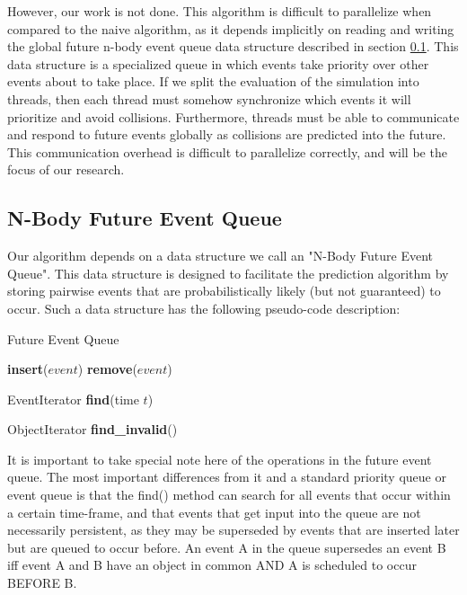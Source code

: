 \documentclass[CEJCS,PDF]{cej} %
\begin{document}
However, our work is not done.  This algorithm is difficult to parallelize when compared to the naive algorithm, as it depends implicitly on reading and writing the global future n-body event queue data structure described in section \ref{sec:neq}.  This data structure is a specialized queue in which events take priority over other events about to take place. If we split the evaluation of the simulation into threads, then each thread must somehow synchronize which events it will prioritize and avoid collisions.  Furthermore, threads must be able to communicate and respond to future events  globally as collisions are predicted into the future.  This communication overhead is difficult to parallelize correctly, and will be the focus of our research.

\subsection{N-Body Future Event Queue}
\label{sec:neq}
Our algorithm depends on a data structure we call an "N-Body Future Event Queue".  This data structure is designed to facilitate the prediction algorithm
by storing pairwise events that are probabilistically likely (but not guaranteed) to occur.  Such a data structure has the following pseudo-code description:

\begin{algorithm}
\caption{Future Event Queue} %
\begin{algorithmic}
\STATE {}
\STATE \textbf{insert}($event$)
\STATE {}
\STATE \textbf{remove}($event$)
	
\STATE {}
\STATE EventIterator \textbf{find}(time $t$)

\STATE {}
\STATE ObjectIterator \textbf{find\_invalid}()
\end{algorithmic}
\end{algorithm}

It is important to take special note here of the operations in the future event queue.  The most important differences from it and a standard priority queue or event queue
is that the find() method can search for all events that occur within a certain time-frame, and that events that get input into the queue are not necessarily persistent, as they 
may be superseded by events that are inserted later but are queued to occur before.  An event A in the queue supersedes an event B iff event A and B have an object in common AND A is scheduled to occur BEFORE B.
\end{document}
